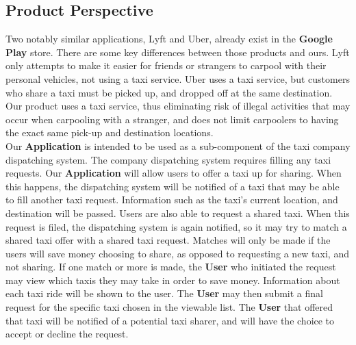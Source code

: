 \documentclass[english]{article}
\begin{document}
\subsection{Product Perspective}
\label{sub:product_perspective}
Two notably similar applications, Lyft and Uber, already exist in the \textbf{Google Play} store. There are some key differences between those products and ours. Lyft only attempts to make it easier for friends or strangers to carpool with their personal vehicles, not using a taxi service. Uber uses a taxi service, but customers who share a taxi must be picked up, and dropped off at the same destination. Our product uses a taxi service, thus eliminating risk of illegal activities that may occur when carpooling with a stranger, and does not limit carpoolers to having the exact same pick-up and destination locations.
\\
\bigskip
Our \textbf{Application} is intended to be used as a sub-component of the taxi company dispatching system. The company dispatching system requires filling any taxi requests. Our \textbf{Application} will allow users to offer a taxi up for sharing. When this happens, the dispatching system will be notified of a taxi that may be able to fill another taxi request. Information such as the taxi's current location, and destination will be passed. Users are also able to request a shared taxi. When this request is filed, the dispatching system is again notified, so it may try to match a shared taxi offer with a shared taxi request. Matches will only be made if the users will save money choosing to share, as opposed to requesting a new taxi, and not sharing. If one match or more is made, the \textbf{User} who initiated the request may view which taxis they may take in order to save money. Information about each taxi ride will be shown to the user. The \textbf{User} may then submit a final request for the specific taxi chosen in the viewable list. The \textbf{User} that offered that taxi will be notified of a potential taxi sharer, and will have the choice to accept or decline the request.
\end{document}
